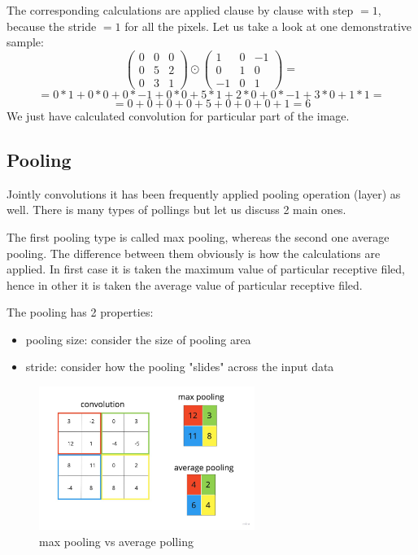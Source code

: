 The corresponding calculations are applied clause by clause with step $= 1$, because the stride $= 1$ for all the pixels. Let us take a look at one demonstrative sample:   
\[ \begin{pmatrix} 0 & 0 & 0 \\ 0 & 5 & 2 \\ 0 & 3 & 1 \end{pmatrix} \odot \begin{pmatrix} 1 & 0 & -1 \\ 0 & 1 & 0 \\ -1 & 0 & 1 \end{pmatrix} = \]
\[ = 0*1 + 0*0 + 0*-1 + 0*0 + 5*1 + 2*0 + 0*-1 + 3*0 + 1*1 = \] 
\[ = 0 + 0 + 0 + 0 + 5 + 0 + 0 + 0 + 1= 6 \]
We just have calculated convolution for particular part of the image. 

\subsection{Pooling}
Jointly convolutions it has been frequently applied pooling operation (layer) as well. There is many types of pollings but let us discuss 2 main ones. 

The first pooling type is called max pooling, whereas the second one average pooling. The difference between them obviously is how the calculations are applied. In first case it is taken the maximum value of particular receptive filed, hence in other it is taken the average value of particular receptive filed.

The pooling has 2 properties:
\begin{itemize}
    \item pooling size: consider the size of pooling area 
    \item stride: consider how the pooling "slides" across the input data 
\end{itemize}    

\begin{figure}[h]
    \centering \includegraphics[width=7cm]{images/pooling.jpg}
    \caption {max pooling vs average polling}
\end{figure}

